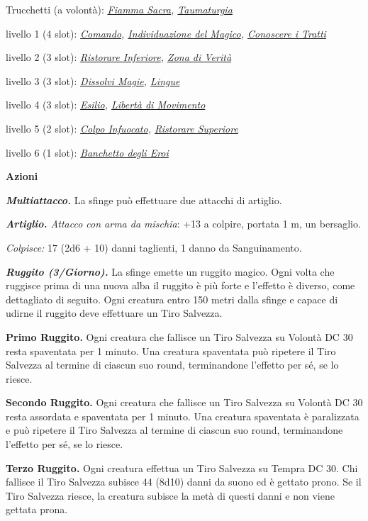 \begin{multicols}{2}
{Trucchetti (a volontà): \emph{\hyperlink{Fiamma Sacra}{Fiamma Sacra}, \hyperlink{Taumaturgia}{Taumaturgia}}

livello 1 (4 slot): \emph{\hyperlink{Comando}{Comando}, \hyperlink{Individuazione del Magico}{Individuazione del Magico}, \hyperlink{Conoscere i Tratti}{Conoscere i Tratti}}

livello 2 (3 slot): \emph{\hyperlink{Ristorare Inferiore}{Ristorare Inferiore}, \hyperlink{Zona di Verità}{Zona di Verità}}

livello 3 (3 slot): \emph{\hyperlink{Dissolvi Magie}{Dissolvi Magie}, \hyperlink{Lingue}{Lingue}}

livello 4 (3 slot): \emph{\hyperlink{Esilio}{Esilio}, \hyperlink{Libertà di Movimento}{Libertà di Movimento}}

livello 5 (2 slot): \emph{\hyperlink{Colpo Infuocato}{Colpo Infuocato}, \hyperlink{Ristorare Superiore}{Ristorare Superiore}}

livello 6 (1 slot): \emph{\hyperlink{Banchetto degli Eroi}{Banchetto degli Eroi}}

\textbf{Azioni}

\emph{\textbf{Multiattacco.}} La sfinge può effettuare due attacchi di artiglio.

\emph{\textbf{Artiglio.} Attacco con arma da mischia}: +13 a colpire, portata 1 m, un bersaglio.

\emph{Colpisce:} 17 (2d6 + 10) danni taglienti, 1 danno da Sanguinamento.

\emph{\textbf{Ruggito (3/Giorno).}} La sfinge emette un ruggito magico. Ogni volta che ruggisce prima di una nuova alba il ruggito è più forte e l'effetto è diverso, come dettagliato di seguito. Ogni creatura entro 150 metri dalla sfinge e capace di udirne il ruggito deve effettuare un Tiro Salvezza.

\textbf{Primo Ruggito.} Ogni creatura che fallisce un Tiro Salvezza su Volontà DC 30 resta spaventata per 1 minuto. Una creatura spaventata può ripetere il Tiro Salvezza al termine di ciascun suo round, terminandone l'effetto per sé, se lo riesce.

\textbf{Secondo Ruggito.} Ogni creatura che fallisce un Tiro Salvezza su Volontà DC 30 resta assordata e spaventata per 1 minuto. Una creatura spaventata è paralizzata e può ripetere il Tiro Salvezza al termine di ciascun suo round, terminandone l'effetto per sé, se lo riesce.

\textbf{Terzo Ruggito.} Ogni creatura effettua un Tiro Salvezza su Tempra DC 30. Chi fallisce il Tiro Salvezza subisce 44 (8d10) danni da suono ed è gettato prono. Se il Tiro Salvezza riesce, la creatura subisce la metà di questi danni e non viene gettata prona.

}
\end{multicols}
